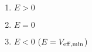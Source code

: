 

\vspace*{\fill}
\centering

\begin{enumerate}
    \item $E > 0$ 
    \item $E = 0$
    \item $E < 0$ ($E = V_{\rm eff,min}$)
\end{enumerate}

\centering
\vspace*{\fill}

